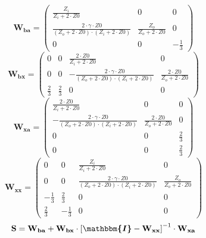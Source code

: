 \[ \mathbf{W_{ba}} = \left(\begin{smallmatrix} \frac{Z_i}{Z_i+2\cdot
Z0} & 0 & 0 \\ \frac{2\cdot \gamma\cdot Z0}{\left(Z_o+2\cdot
Z0\right)\cdot\left(Z_i+2\cdot Z0\right)} & \frac{Z_o}{Z_o+2\cdot Z0}
& 0 \\ 0 & 0 & -\frac{1}{3} \end{smallmatrix}\right) \]
\[ \mathbf{W_{bx}} = \left(\begin{smallmatrix} 0 & 0 & \frac{2\cdot
Z0}{Z_i+2\cdot Z0} & 0 \\ 0 & 0 & -\frac{2\cdot \gamma\cdot
Z0}{\left(Z_o+2\cdot Z0\right)\cdot\left(Z_i+2\cdot Z0\right)} &
\frac{2\cdot Z0}{Z_o+2\cdot Z0} \\ \frac{2}{3} & \frac{2}{3} & 0 & 0
\end{smallmatrix}\right) \]
\[ \mathbf{W_{xa}} = \left(\begin{smallmatrix} \frac{2\cdot
Z0}{Z_i+2\cdot Z0} & 0 & 0 \\ -\frac{2\cdot \gamma\cdot
Z0}{\left(Z_o+2\cdot Z0\right)\cdot\left(Z_i+2\cdot Z0\right)} &
\frac{2\cdot Z0}{Z_o+2\cdot Z0} & 0 \\ 0 & 0 & \frac{2}{3} \\ 0 & 0 &
\frac{2}{3} \end{smallmatrix}\right) \]
\[ \mathbf{W_{xx}} = \left(\begin{smallmatrix} 0 & 0 &
\frac{Z_i}{Z_i+2\cdot Z0} & 0 \\ 0 & 0 & \frac{2\cdot \gamma\cdot
Z0}{\left(Z_o+2\cdot Z0\right)\cdot\left(Z_i+2\cdot Z0\right)} &
\frac{Z_o}{Z_o+2\cdot Z0} \\ -\frac{1}{3} & \frac{2}{3} & 0 & 0 \\
\frac{2}{3} & -\frac{1}{3} & 0 & 0 \end{smallmatrix}\right) \]
\[ \mathbf{S}=\mathbf{W_{ba}}+\mathbf{W_{bx}}\cdot\left[
\boldsymbol{\mathbbm{I}}
-\mathbf{W_{xx}}\right]^{-1}\cdot\mathbf{W_{xa}} \]
